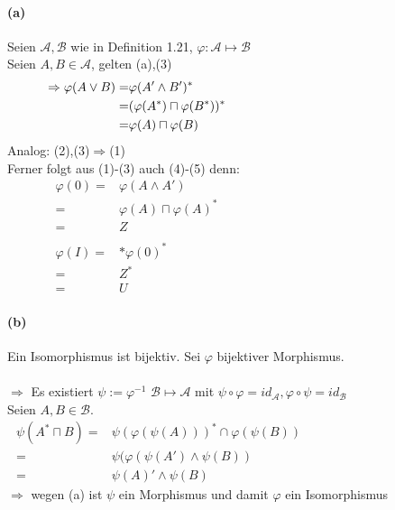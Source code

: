 \documentclass[10pt, a4paper]{article}
\begin{document}
\paragraph*{(a)}
Seien $\boxed{\mathcal{A}},\boxed{\mathcal{B}}$ wie in Definition 1.21, $\varphi:\mathcal{A}\mapsto\mathcal{B}$	\\
Seien $A,B\in\mathcal{A}$, gelten (a),(3)
\begin{align*}
	\Rightarrow\varphi(A\vee B)=&\varphi(A'\wedge B')^{*}	\hspace{2.5in}\\
	=&(\varphi(A^{*})\sqcap \varphi(B^{*}))^{*}	\\
	=&\varphi(A)\sqcap\varphi(B)
\end{align*}
Analog: (2),(3)$\Rightarrow$(1)	\\
Ferner folgt aus (1)-(3) auch (4)-(5) denn:
\begin{align*}
	\varphi(0)=&\varphi(A\wedge A')	\hspace{3in}\\
	=& \varphi(A)\sqcap\varphi(A)^{*}	\\
	=& Z	\\	\\
	\varphi(I)=&*\varphi(0)^{*}	\\
	=&Z^{*}	\\
	=& U
\end{align*}


\paragraph*{(b)}
Ein Isomorphismus ist bijektiv. Sei $\varphi$ bijektiver Morphismus.	\\	\\
$\Rightarrow$ Es existiert $\psi:=\varphi^{-1}$ $\mathcal{B}\mapsto\mathcal{A}$ mit $\psi\circ\varphi=id_{\mathcal{A}}, \varphi\circ\psi=id_{\mathcal{B}}$	\\

Seien $A,B\in\mathcal{B}$.
\begin{align*}
	\psi(A^{*}\sqcap B)=&\psi(\varphi(\psi(A)))^{*}\cap\varphi(\psi(B))	\hspace{2in}\\
	=&\psi(\varphi(\psi(A')\wedge\psi(B))	\\
	=&\psi(A)'\wedge\psi(B)
\end{align*}
$\Rightarrow$ wegen (a) ist $\psi$ ein Morphismus und damit $\varphi$ ein Isomorphismus
\end{document}
